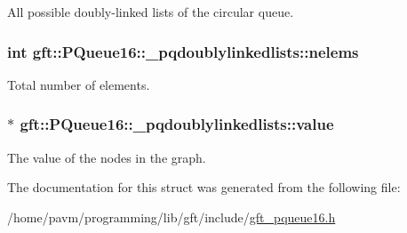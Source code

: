 All possible doubly-\/linked lists of the circular queue. 

\hypertarget{structgft_1_1PQueue16_1_1__pqdoublylinkedlists_ae51ba2f93a5a4ac83e9c3f2baf63bdc7}{
\subsubsection[{nelems}]{\setlength{\rightskip}{0pt plus 5cm}int gft\-::\-P\-Queue16\-::\-\_\-pqdoublylinkedlists\-::nelems}}\label{structgft_1_1PQueue16_1_1__pqdoublylinkedlists_ae51ba2f93a5a4ac83e9c3f2baf63bdc7}


Total number of elements. 

\hypertarget{structgft_1_1PQueue16_1_1__pqdoublylinkedlists_acac5733fab27f2e9c9c9b42ecf373d1e}{
\subsubsection[{value}]{$\ast$ gft\-::\-P\-Queue16\-::\-\_\-pqdoublylinkedlists\-::value}}\label{structgft_1_1PQueue16_1_1__pqdoublylinkedlists_acac5733fab27f2e9c9c9b42ecf373d1e}


The value of the nodes in the graph. 



The documentation for this struct was generated from the following file\-:\begin{DoxyCompactItemize}
\item 
/home/pavm/programming/lib/gft/include/\hyperlink{gft__pqueue16_8h}{gft\-\_\-pqueue16.\-h}\end{DoxyCompactItemize}
